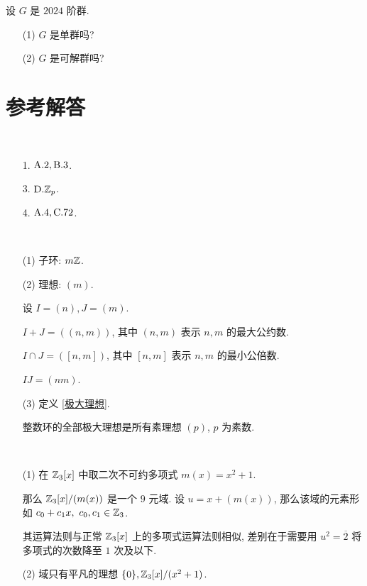 \problem[题目 8] 设 $G$ 是 $2024$ 阶群.

\begin{itemize}
	\item[(1)] $G$ 是单群吗?
	\item[(2)] $G$ 是可解群吗?
\end{itemize}

\newpage
\section*{参考解答}

\problem[题目 1]

\begin{solution}\
	\begin{itemize}
		\item[1.] $\text {A}.2,\text {B}.3$.
		\item[3.] $\text {D}.\mathbb Z_p$.
		\item[4.] $\text {A}.4,\text {C}.72$.
	\end{itemize}
\end{solution}

\problem[题目 2]

\begin{solution}\
	\begin{itemize}
		\item[(1)] 子环: $m\mathbb Z$.
		\item[(2)] 理想: $(m)$.

		设 $I=(n),J=(m)$.

		$I+J=((n,m))$, 其中 $(n,m)$ 表示 $n,m$ 的最大公约数.

		$I\cap J=([n,m])$, 其中 $[n,m]$ 表示 $n,m$ 的最小公倍数.

		$IJ=(nm)$.

		\item[(3)]定义 \ref{极大理想}.

		整数环的全部极大理想是所有素理想 $(p)$, $p$ 为素数.
	\end{itemize}
\end{solution}

\problem[题目 3]

\begin{solution}\
	\begin{itemize}
		\item[(1)] 在 $\mathbb Z_3[x]$ 中取二次不可约多项式 $m(x)=x^2+1$.

		那么 $\mathbb Z_3[x]/(m(x))$ 是一个 $9$ 元域. 设 $u=x+(m(x))$, 那么该域的元素形如 $c_0+c_1x,\ c_0,c_1\in\Z_3$.

		其运算法则与正常 $\mathbb Z_3[x]$ 上的多项式运算法则相似, 差别在于需要用 $u^2=\overline{2}$ 将多项式的次数降至 $1$ 次及以下.

		\item[(2)] 域只有平凡的理想 $\{0\},\mathbb Z_3[x]/(x^2+1)$.
	\end{itemize}
\end{solution}

